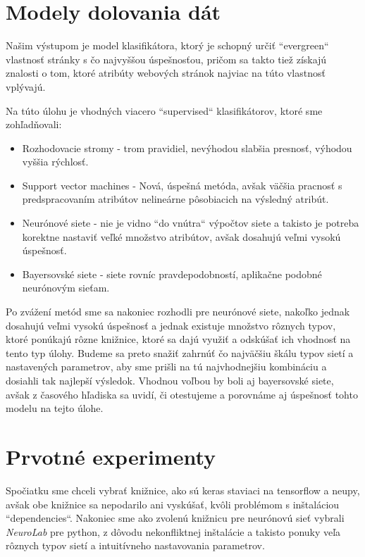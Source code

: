 \documentclass{iitsrc}
\begin{document}
\begin{multicols}{2}
\section{Modely dolovania dát}
Našim výstupom je model klasifikátora, ktorý je schopný určiť ``evergreen`` vlastnosť stránky s čo najvyššou úspešnosťou, pričom sa takto tiež získajú znalosti o tom, ktoré atribúty webových stránok najviac na túto vlastnosť vplývajú.

Na túto úlohu je vhodných viacero ``supervised`` klasifikátorov, ktoré sme zohľadňovali:

\begin{itemize}
	\item Rozhodovacie stromy - trom pravidiel, nevýhodou slabšia presnosť, výhodou vyššia rýchlosť.
	\item Support vector machines - Nová, úspešná metóda, avšak väčšia pracnosť s predspracovaním atribútov nelineárne pôsobiacich na výsledný atribút.
	\item Neurónové siete - nie je vidno ``do vnútra`` výpočtov siete a takisto je potreba korektne nastaviť veľké množstvo atribútov, avšak dosahujú veľmi vysokú úspešnosť.
	\item Bayersovské siete - siete rovníc pravdepodobností, aplikačne podobné neurónovým sieťam.
\end{itemize}

Po zvážení metód sme sa nakoniec rozhodli pre neurónové siete, nakoľko jednak dosahujú veľmi vysokú úspešnosť a jednak existuje množstvo rôznych typov, ktoré ponúkajú rôzne knižnice, ktoré sa dajú využiť a odskúšať ich vhodnosť na tento typ úlohy. Budeme sa preto snažiť zahrnúť čo najväčšiu škálu typov sietí a nastavených parametrov, aby sme prišli na tú najvhodnejšiu kombináciu a dosiahli tak najlepší výsledok. Vhodnou voľbou by boli aj bayersovské siete, avšak z časového hľadiska sa uvidí, či otestujeme a porovnáme aj úspešnosť tohto modelu na tejto úlohe.

\section{Prvotné experimenty}
Spočiatku sme chceli vybrať knižnice, ako sú keras staviaci na tensorflow a neupy, avšak obe knižnice sa nepodarilo ani vyskúšať, kvôli problémom s inštaláciou ``dependencies``. Nakoniec sme ako zvolenú knižnicu pre neurónovú sieť vybrali \emph{NeuroLab} pre python, z dôvodu nekonfliktnej inštalácie a takisto ponuky veľa rôznych typov sietí a intuitívneho nastavovania parametrov.


\end{multicols}
\end{document}
